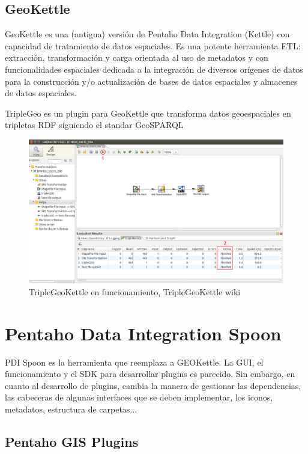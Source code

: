 \subsection{GeoKettle}

GeoKettle es una (antigua) versión de Pentaho Data Integration (Kettle)\cite{pentaho} con capacidad de tratamiento de datos
espaciales. Es una potente herramienta ETL: extracción, transformación y carga orientada al uso de metadatos y
con funcionalidades espaciales dedicada a la integración de diversos orígenes de datos para la construcción y/o
actualización de bases de datos espaciales y almacenes de datos espaciales. \cite{geokettle-osg}

TripleGeo es un plugin para GeoKettle que transforma datos geoespaciales en tripletas RDF siguiendo el standar
GeoSPARQL \cite{triplegeo}

\begin{figure}[H]
    \includegraphics[width=\textwidth]{images/kettle.png}
    \centering
    \caption{TripleGeoKettle en funcionamiento, TripleGeoKettle wiki}
    \label{fig:kettle}
\end{figure}

\section{Pentaho Data Integration Spoon}

PDI Spoon\cite{pdi-spoon} es la herramienta que reemplaza a GEOKettle. La GUI, el funcionamiento y el SDK para desarrollar
plugins es parecido. Sin embargo, en cuanto al desarrollo de plugins, cambia la manera de gestionar las
dependencias, las cabeceras de algunas interfaces que se deben implementar, los iconos, metadatos, estructura de
carpetas...

\subsection{Pentaho GIS Plugins}

